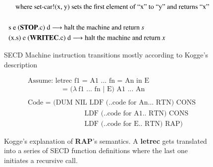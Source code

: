 \documentclass[a4paper,12pt,twoside,openright]{report}
\theoremstyle{definition}
\begin{document}
\begin{appendices}
\begin{figure}[htp!]
\begin{align*}
    & \quad\text{where set-car!(x, y) sets the first element of ``x'' to ``y'' and returns ``x''} \\ \\%
    & \text{s e (\textbf{STOP}.c) d} \longrightarrow \text{halt the machine and return \textit{s}} \\
    & \text{(x.s) e (\textbf{WRITEC}.c) d} \longrightarrow \text{halt the machine and return \textit{x}}
    \end{align*}
    \caption{SECD Machine instruction transitions mostly according to Kogge's description \cite{kogge1990architecture}}
    \label{fig:secd_kogge}
\end{figure}

\begin{figure}[htp!]
    \centering
    \begin{align*}
        & \text{Assume: letrec f1 = A1 ... fn = An in E} \\
        & \qquad\qquad\quad\text{= (} \lambda \: \text{f1 ... fn } | \text{ E) A1 ... An} \\ \\%
        & \text{Code = (DUM NIL LDF (..code for An... RTN) CONS} \\
        & \qquad\qquad\qquad\qquad\,\text{LDF (..code for A1.. RTN) CONS} \\
        & \qquad\qquad\qquad\qquad\,\text{LDF (..code for E.. RTN) RAP)}
    \end{align*}
    \caption{Kogge's \cite{kogge1990architecture} explanation of \textbf{RAP}'s semantics. A \textbf{letrec} gets translated into a series of SECD function definitions where the last one initiates a recursive call.}
    \label{fig:secd_kogge_rap}
\end{figure}
\end{appendices}
\end{document}
